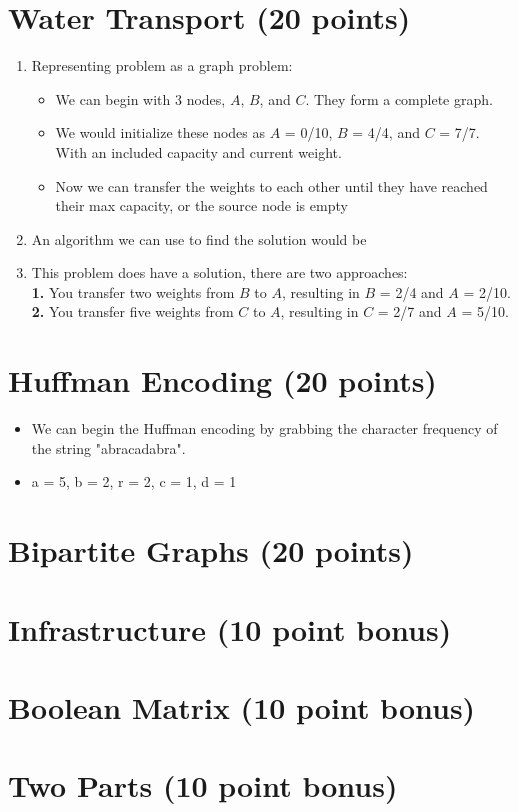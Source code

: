 \documentclass{article}[12pt]
\begin{document}
\section{Water Transport (20 points)}
\begin{enumerate}
  \item Representing problem as a graph problem: 
    \begin{itemize}
      \item We can begin with 3 nodes, $A$, $B$, and $C$. They form a complete graph.
      \item We would initialize these nodes as $A$ = 0/10, $B$ = 4/4, and $C$ = 7/7.
        With an included capacity and current weight.
      \item Now we can transfer the weights to each other until they have reached their max capacity, or the source node is empty
    \end{itemize}
  \item An algorithm we can use to find the solution would be
    \item This problem does have a solution, there are two approaches: \\ 
      \textbf{1.} You transfer two weights from $B$ to $A$, resulting in $B$ = 2/4 and $A$ = 2/10.  \\
      \textbf{2.} You transfer five weights from $C$ to $A$, resulting in $C$ = 2/7 and  $A$ = 5/10.
\end{enumerate}

\newpage
\section{Huffman Encoding (20 points)}
\begin{itemize}
  \item We can begin the Huffman encoding by grabbing the character frequency
    of the string "abracadabra".
  \item  a = 5, b = 2, r = 2, c = 1, d = 1
\end{itemize}

\newpage
\section{Bipartite Graphs (20 points)}
\newpage
\section{Infrastructure (10 point bonus)}

\newpage
\section{Boolean Matrix (10 point bonus)}

\newpage
\section{Two Parts (10 point bonus)}
\end{document}
